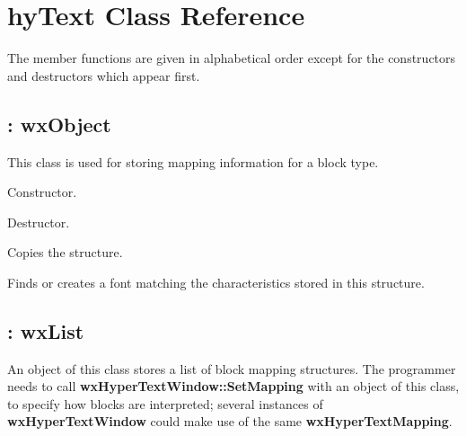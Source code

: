 \chapter{hyText Class Reference}
%
\setfooter{\thepage}{}{}{}{}{\thepage}

The member functions are given in alphabetical order except for the
constructors and destructors which appear first.

\section{: wxObject}

This class is used for storing mapping information for a block type.



Constructor.



Destructor.



Copies the structure.



Finds or creates a font matching the characteristics stored in this
structure.

\section{: wxList}

An object of this class stores a list of block mapping structures. The
programmer needs to call {\bf wxHyperTextWindow::SetMapping} with an
object of this class, to specify how blocks are interpreted; several
instances of {\bf wxHyperTextWindow} could make use of the same {\bf
wxHyperTextMapping}.

